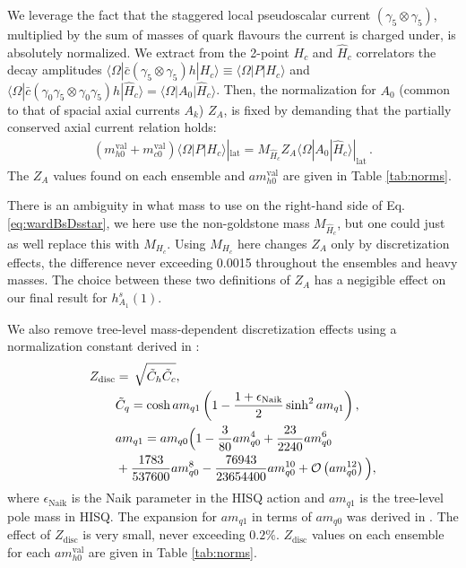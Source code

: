 We leverage the fact that the staggered local pseudoscalar current $(\gamma_5\otimes \gamma_5)$, multiplied by the sum of masses of quark flavours the current is charged under, is absolutely normalized. We extract from the 2-point $H_c$ and $\hat{H}_c$ correlators the decay amplitudes $\langle \Omega | \bar{c} (\gamma_5\otimes \gamma_5) h | H_c \rangle \equiv \langle \Omega | P | H_c \rangle$ and $\langle \Omega | \bar{c} (\gamma_0\gamma_5 \otimes \gamma_0\gamma_5) h | \hat{H}_c \rangle = \langle \Omega | A_0 | \hat{H}_c \rangle$. Then, the normalization for $A_0$ (common to that of spacial axial currents $A_k$) $Z_A$, is fixed by demanding that the partially conserved axial current relation holds:
\begin{align}
  (m^{\text{val}}_{h0} + m^{\text{val}}_{c0}) \langle \Omega | P | H_c \rangle|_{\text{lat}} = M_{\hat{H}_c} Z_A \langle \Omega | A_0 | \hat{H}_c \rangle|_{\text{lat}}\,.
  \label{eq:wardBsDsstar}
\end{align}
The $Z_A$ values found on each ensemble and $am^{\text{val}}_{h0}$ are given in Table \ref{tab:norms}.

There is an ambiguity in what mass to use on the right-hand side of Eq. \eqref{eq:wardBsDsstar}, we here use the non-goldstone mass $M_{\hat{H}_c}$, but one could just as well replace this with $M_{H_c}$. Using $M_{H_c}$ here changes $Z_A$ only by discretization effects, the difference never exceeding 0.0015 throughout the ensembles and heavy masses. The choice between these two definitions of $Z_A$ has a negigible effect on our final result for $h^s_{A_1}(1)$.

We also remove tree-level mass-dependent discretization effects using a normalization constant derived in \cite{Monahan:2012dq,Bazavov:2017lyh}:
\begin{align}
  \label{eq:Zdisc}
  Z_{\text{disc}} &=\,\sqrt{ \tilde{C}_h \tilde{C}_c }, \\
  \nonumber
  &\tilde{C}_q = \cosh am_{q1} \left( 1 - {1+\epsilon_{\text{Naik}}\over 2} \sinh^2 am_{q1} \right), \\ \nonumber
  &am_{q1} = am_{q0} \Big( 1 - {3\over 80}am_{q0}^4 + {23\over 2240}am_{q0}^6 \\ \nonumber
  &+ {1783\over 537600} am_{q0}^8 - {76943\over23654400}am_{q0}^{10} + \mathcal{O}\left( am_{q0}^{12} \right) \Big), \nonumber
\end{align}
where $\epsilon_{\text{Naik}}$ is the Naik parameter in the HISQ action and $am_{q1}$ is the tree-level pole mass in HISQ. The expansion for $am_{q1}$ in terms of $am_{q0}$ was derived in \cite{Follana:2006rc}. The effect of $Z_{\text{disc}}$ is very small, never exceeding $0.2\%$. $Z_{\text{disc}}$ values on each ensemble for each $am^{\text{val}}_{h0}$ are given in Table \ref{tab:norms}.

